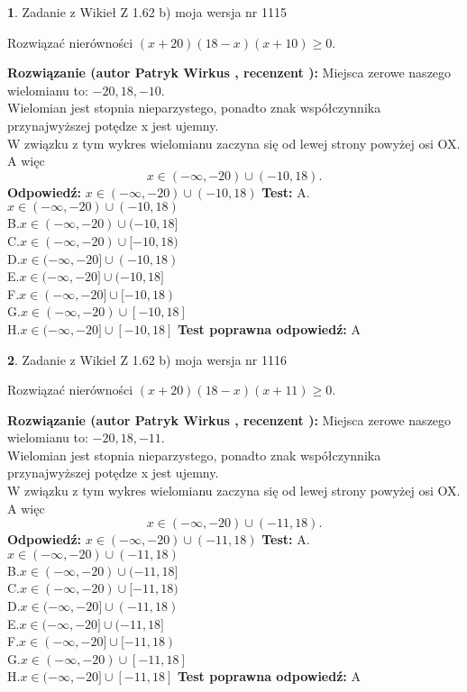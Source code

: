 \documentclass[12pt, a4paper]{article}
\theoremstyle{definition} %
\newtheorem{zad}{}
\newcommand{\zadStart}[1]{\begin{zad}#1\newline}
\newcommand{\zadStop}{\end{zad}}
\newcommand{\rozwStart}[2]{\noindent \textbf{Rozwiązanie (autor #1 , recenzent #2): }\newline}
\newcommand{\rozwStop}{\newline}
\newcommand{\odpStart}{\noindent \textbf{Odpowiedź:}\newline}
\newcommand{\odpStop}{\newline}
\newcommand{\testStart}{\noindent \textbf{Test:}\newline}
\newcommand{\testStop}{\newline}
\newcommand{\kluczStart}{\noindent \textbf{Test poprawna odpowiedź:}\newline}
\newcommand{\kluczStop}{\newline}
\begin{document}
\zadStart{Zadanie z Wikieł Z 1.62 b) moja wersja nr 1115}

Rozwiązać nierówności $(x+20)(18-x)(x+10)\ge0$.
\zadStop
\rozwStart{Patryk Wirkus}{}
Miejsca zerowe naszego wielomianu to: $-20, 18, -10$.\\
Wielomian jest stopnia nieparzystego, ponadto znak współczynnika przy\linebreak najwyższej potędze x jest ujemny.\\ W związku z tym wykres wielomianu zaczyna się od lewej strony powyżej osi OX. A więc $$x \in (-\infty,-20) \cup (-10,18).$$
\rozwStop
\odpStart
$x \in (-\infty,-20) \cup (-10,18)$
\odpStop
\testStart
A.$x \in (-\infty,-20) \cup (-10,18)$\\
B.$x \in (-\infty,-20) \cup (-10,18]$\\
C.$x \in (-\infty,-20) \cup [-10,18)$\\
D.$x \in (-\infty,-20] \cup (-10,18)$\\
E.$x \in (-\infty,-20] \cup (-10,18]$\\
F.$x \in (-\infty,-20] \cup [-10,18)$\\
G.$x \in (-\infty,-20) \cup [-10,18]$\\
H.$x \in (-\infty,-20] \cup [-10,18]$
\testStop
\kluczStart
A
\kluczStop



\zadStart{Zadanie z Wikieł Z 1.62 b) moja wersja nr 1116}

Rozwiązać nierówności $(x+20)(18-x)(x+11)\ge0$.
\zadStop
\rozwStart{Patryk Wirkus}{}
Miejsca zerowe naszego wielomianu to: $-20, 18, -11$.\\
Wielomian jest stopnia nieparzystego, ponadto znak współczynnika przy\linebreak najwyższej potędze x jest ujemny.\\ W związku z tym wykres wielomianu zaczyna się od lewej strony powyżej osi OX. A więc $$x \in (-\infty,-20) \cup (-11,18).$$
\rozwStop
\odpStart
$x \in (-\infty,-20) \cup (-11,18)$
\odpStop
\testStart
A.$x \in (-\infty,-20) \cup (-11,18)$\\
B.$x \in (-\infty,-20) \cup (-11,18]$\\
C.$x \in (-\infty,-20) \cup [-11,18)$\\
D.$x \in (-\infty,-20] \cup (-11,18)$\\
E.$x \in (-\infty,-20] \cup (-11,18]$\\
F.$x \in (-\infty,-20] \cup [-11,18)$\\
G.$x \in (-\infty,-20) \cup [-11,18]$\\
H.$x \in (-\infty,-20] \cup [-11,18]$
\testStop
\kluczStart
A
\kluczStop
\end{document}
